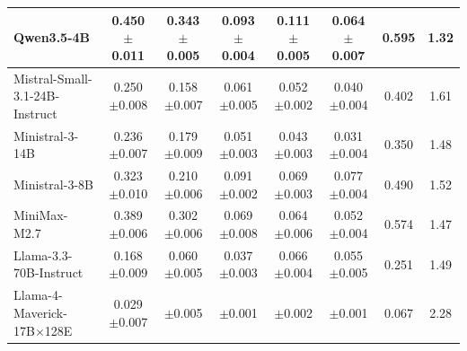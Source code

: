 \begin{table}[t]
{\begin{tabular}{l c c c c c c c}
Qwen3.5-4B                       & 0.450 {\color{blue}\scriptsize $\pm$0.011} & \cellcolor{red!17}0.343 {\color{blue}\scriptsize $\pm$0.005} & \cellcolor{red!7}0.093 {\color{blue}\scriptsize $\pm$0.004} & \cellcolor{red!9}0.111 {\color{blue}\scriptsize $\pm$0.005} & \cellcolor{red!5}0.064 {\color{blue}\scriptsize $\pm$0.007} & 0.595 & 1.32 \\
\midrule
Mistral-Small-3.1-24B-Instruct   & 0.250 {\color{blue}\scriptsize $\pm$0.008} & \cellcolor{red!8}0.158 {\color{blue}\scriptsize $\pm$0.007} & \cellcolor{red!6}0.061 {\color{blue}\scriptsize $\pm$0.005} & \cellcolor{red!6}0.052 {\color{blue}\scriptsize $\pm$0.002} & \cellcolor{red!5}0.040 {\color{blue}\scriptsize $\pm$0.004} & 0.402 & 1.61 \\
Ministral-3-14B                  & 0.236 {\color{blue}\scriptsize $\pm$0.007} & \cellcolor{red!9}0.179 {\color{blue}\scriptsize $\pm$0.009} & \cellcolor{red!5}0.051 {\color{blue}\scriptsize $\pm$0.003} & \cellcolor{red!4}0.043 {\color{blue}\scriptsize $\pm$0.003} & \cellcolor{red!3}0.031 {\color{blue}\scriptsize $\pm$0.004} & 0.350 & 1.48 \\
Ministral-3-8B                   & 0.323 {\color{blue}\scriptsize $\pm$0.010} & \cellcolor{red!13}0.210 {\color{blue}\scriptsize $\pm$0.006} & \cellcolor{red!8}0.091 {\color{blue}\scriptsize $\pm$0.002} & \cellcolor{red!7}0.069 {\color{blue}\scriptsize $\pm$0.003} & \cellcolor{red!7}0.077 {\color{blue}\scriptsize $\pm$0.004} & 0.490 & 1.52 \\
\midrule
MiniMax-M2.7                     & 0.389 {\color{blue}\scriptsize $\pm$0.006} & \cellcolor{red!22}0.302 {\color{blue}\scriptsize $\pm$0.006} & \cellcolor{red!6}0.069 {\color{blue}\scriptsize $\pm$0.008} & \cellcolor{red!6}0.064 {\color{blue}\scriptsize $\pm$0.006} & \cellcolor{red!5}0.052 {\color{blue}\scriptsize $\pm$0.004} & 0.574 & 1.47 \\
\midrule
Llama-3.3-70B-Instruct           & 0.168 {\color{blue}\scriptsize $\pm$0.009} & \cellcolor{green!5}0.060 {\color{blue}\scriptsize $\pm$0.005} & \cellcolor{green!5}0.037 {\color{blue}\scriptsize $\pm$0.003} & \cellcolor{red!5}0.066 {\color{blue}\scriptsize $\pm$0.004} & \cellcolor{red!5}0.055 {\color{blue}\scriptsize $\pm$0.005} & 0.251 & 1.49 \\
Llama-4-Maverick-17B×128E        & {\color{ForestGreen}0.029} {\color{blue}\scriptsize $\pm$0.007} & \cellcolor{green!10}{\color{ForestGreen}0.018} {\color{blue}\scriptsize $\pm$0.005} & \cellcolor{green!10}{\color{ForestGreen}0.003} {\color{blue}\scriptsize $\pm$0.001} & \cellcolor{green!10}{\color{ForestGreen}0.007} {\color{blue}\scriptsize $\pm$0.002} & \cellcolor{green!10}{\color{ForestGreen}0.003} {\color{blue}\scriptsize $\pm$0.001} & {\color{ForestGreen}0.067} & {\color{ForestGreen}2.28} \\

\end{tabular}}
\end{table}

